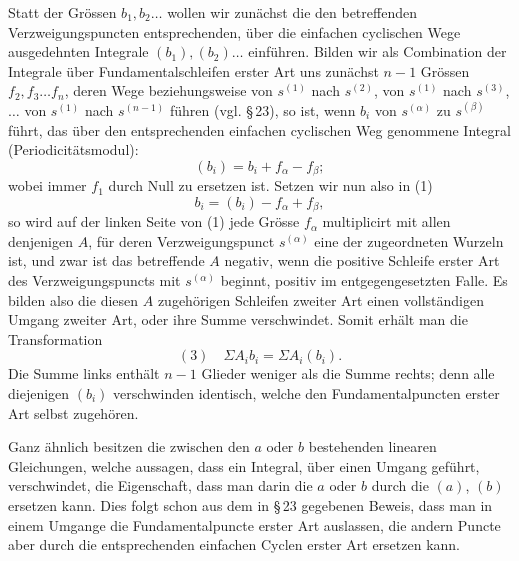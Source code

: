 \documentclass[10pt]{article}
\begin{document}
Statt der Grössen \(b_1,b_2\ldots\) wollen wir zunächst die den betreffenden Verzweigungspuncten entsprechenden, über die einfachen cyclischen Wege ausgedehnten Integrale \((b_1),(b_2)\ldots\) einführen. Bilden wir als Combination der Integrale über Fundamentalschleifen erster Art uns zunächst \(n-1\) Grössen \(f_2,f_3\ldots f_n\), deren Wege beziehungsweise von \(s^{(1)}\) nach \(s^{(2)}\), von \(s^{(1)}\) nach \(s^{(3)}\), \(\ldots\) von \(s^{(1)}\) nach \(s^{(n-1)}\) führen (vgl. \S\,23), so ist, wenn \(b_i\) von \(s^{(\alpha)}\) zu \(s^{(\beta)}\) führt, das über den entsprechenden einfachen cyclischen Weg genommene Integral (Periodicitätsmodul):
\[
(b_i)=b_i+f_{\alpha}-f_{\beta};
\]
wobei immer \(f_1\) durch Null zu ersetzen ist. Setzen wir nun also in (1)
\[
b_i=(b_i)-f_{\alpha}+f_{\beta},
\]
so wird auf der linken Seite von (1) jede Grösse \(f_{\alpha}\) multiplicirt mit allen denjenigen \(A\), für deren Verzweigungspunct \(s^{(\alpha)}\) eine der zugeordneten Wurzeln ist, und zwar ist das betreffende \(A\) negativ, wenn die positive Schleife erster Art des Verzweigungspuncts mit \(s^{(\alpha)}\) beginnt, positiv im entgegengesetzten Falle. Es bilden also die diesen \(A\) zugehörigen Schleifen zweiter Art einen vollständigen Umgang zweiter Art, oder ihre Summe verschwindet. Somit erhält man die Transformation
\[
(3)\quad \Sigma A_i b_i=\Sigma A_i(b_i).
\]
Die Summe links enthält \(n-1\) Glieder weniger als die Summe rechts; denn alle diejenigen \((b_i)\) verschwinden identisch, welche den Fundamentalpuncten erster Art selbst zugehören.

Ganz ähnlich besitzen die zwischen den \(a\) oder \(b\) bestehenden linearen Gleichungen, welche aussagen, dass ein Integral, über einen Umgang geführt, verschwindet, die Eigenschaft, dass man darin die \(a\) oder \(b\) durch die \((a)\), \((b)\) ersetzen kann. Dies folgt schon aus dem in \S\,23 gegebenen Beweis, dass man in einem Umgange die Fundamentalpuncte erster Art auslassen, die andern Puncte aber durch die entsprechenden einfachen Cyclen erster Art ersetzen kann.
\end{document}
